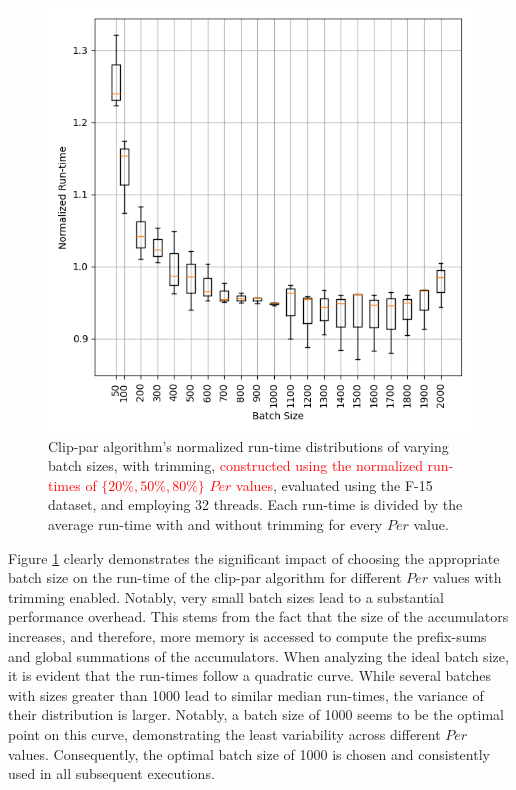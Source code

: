 \documentclass{egpubl}
\newcommand*{\fix}[1]{\textcolor{red}{#1}}
\begin{document}
\begin{figure}[H]
    \centering
    \includegraphics[width=\linewidth]{./Figures/Batch-Size}
    \caption{Clip-par algorithm's normalized run-time distributions of varying batch sizes, with trimming, \fix{constructed using the normalized run-times of $\{20\%, 50\%, 80\%\}$ $Per$ values}, evaluated using the F-15 dataset, and employing 32 threads. Each run-time is divided by the average run-time with and without trimming for every $Per$ value.
    }
    \label{fig:batch-size}
\end{figure}

Figure \ref{fig:batch-size} clearly demonstrates the significant impact of choosing the appropriate batch size on the run-time of the clip-par algorithm for different $Per$ values with trimming enabled. Notably, very small batch sizes lead to a substantial performance overhead. This stems from the fact that the size of the accumulators increases, and therefore, more memory is accessed to compute the prefix-sums and global summations of the accumulators. When analyzing the ideal batch size, it is evident that the run-times follow a quadratic curve. While several batches with sizes greater than 1000 lead to similar median run-times, the variance of their distribution is larger. Notably, a batch size of 1000 seems to be the optimal point on this curve, demonstrating the least variability across different $Per$ values. Consequently, the optimal batch size of 1000 is chosen and consistently used in all subsequent executions.
\end{document}
